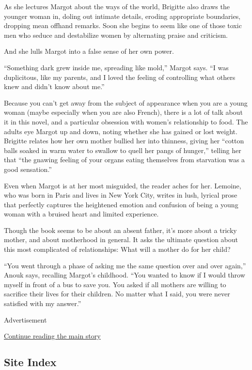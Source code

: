 As she lectures Margot about the ways of the world, Brigitte also draws
the younger woman in, doling out intimate details, eroding appropriate
boundaries, dropping mean offhand remarks. Soon she begins to seem like
one of those toxic men who seduce and destabilize women by alternating
praise and criticism.

And she lulls Margot into a false sense of her own power.

``Something dark grew inside me, spreading like mold,'' Margot says. ``I
was duplicitous, like my parents, and I loved the feeling of controlling
what others knew and didn't know about me.''

Because you can't get away from the subject of appearance when you are a
young woman (maybe especially when you are also French), there is a lot
of talk about it in this novel, and a particular obsession with women's
relationship to food. The adults eye Margot up and down, noting whether
she has gained or lost weight. Brigitte relates how her own mother
bullied her into thinness, giving her ``cotton balls soaked in warm
water to swallow to quell her pangs of hunger,'' telling her that ``the
gnawing feeling of your organs eating themselves from starvation was a
good sensation.''

Even when Margot is at her most misguided, the reader aches for her.
Lemoine, who was born in Paris and lives in New York City, writes in
lush, lyrical prose that perfectly captures the heightened emotion and
confusion of being a young woman with a bruised heart and limited
experience.

Though the book seems to be about an absent father, it's more about a
tricky mother, and about motherhood in general. It asks the ultimate
question about this most complicated of relationships: What will a
mother do for her child?

``You went through a phase of asking me the same question over and over
again,'' Anouk says, recalling Margot's childhood. ``You wanted to know
if I would throw myself in front of a bus to save you. You asked if all
mothers are willing to sacrifice their lives for their children. No
matter what I said, you were never satisfied with my answer.''

Advertisement

\protect\hyperlink{after-bottom}{Continue reading the main story}

\hypertarget{site-index}{%
\subsection{Site Index}\label{site-index}}

